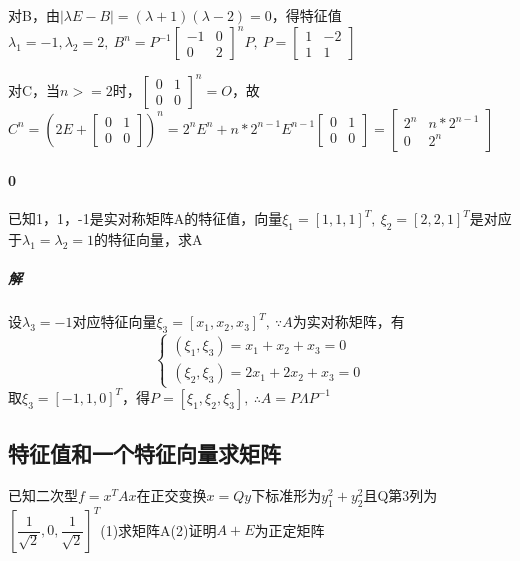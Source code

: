 对B，由\(|\lambda E - B| = (\lambda + 1)(\lambda - 2) = 0\)，得特征值\(\lambda_1 = -1, \lambda_2 = 2,\ B^n = P^{-1}\begin{bmatrix}
    -1 & 0 \\ 
    0 & 2
\end{bmatrix}^nP,\ P = \begin{bmatrix}
    1 & -2 \\ 
    1 & 1
\end{bmatrix}\)

对C，当\(n >= 2\)时，\(\begin{bmatrix}
    0 & 1 \\ 
    0 & 0
\end{bmatrix}^n = O\)，故\(C^n = (2E + \begin{bmatrix}
    0 & 1 \\ 
    0 & 0
\end{bmatrix})^n = 2^nE^n + n * 2^{n - 1}E^{n - 1}\begin{bmatrix}
    0 & 1 \\ 
    0 & 0
\end{bmatrix} = \begin{bmatrix}
    2^n & n * 2^{n - 1} \\ 
    0 & 2^n
\end{bmatrix}\)

\paragraph{0}
已知1，1，-1是实对称矩阵A的特征值，向量\(\xi_1 = [1, 1, 1]^T,\ \xi_2 = [2, 2, 1]^T\)是对应于\(\lambda_1 = \lambda_2 = 1\)的特征向量，求A
\subparagraph{解}
设\(\lambda_3 = -1\)对应特征向量\(\xi_3 = [x_1, x_2, x_3]^T,\ \because A\)为实对称矩阵，有\[\begin{cases}
    (\xi_1, \xi_3) = x_1 + x_2 + x_3 = 0 \\ 
    (\xi_2, \xi_3) = 2x_1 + 2x_2 + x_3 = 0
\end{cases}\]
取\(\xi_3 = [-1, 1, 0]^T\)，得\(P = [\xi_1, \xi_2, \xi_3],\ \therefore A = P\Lambda P^{-1}\)

\subsection{特征值和一个特征向量求矩阵}
已知二次型\(f = x^TAx\)在正交变换\(x = Qy\)下标准形为\(y_1^2 + y_2^2\)且Q第3列为\([\dfrac{1}{\sqrt{2}}, 0, \dfrac{1}{\sqrt{2}}]^T\)(1)求矩阵A(2)证明\(A + E\)为正定矩阵

